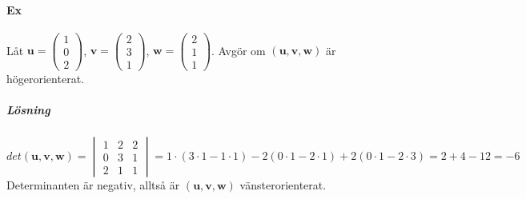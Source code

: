 \paragraph{Ex} Låt $\bm{u}=\begin{pmatrix}1\\0\\2\end{pmatrix}$, $\bm{v}=\begin{pmatrix}2\\3\\1\end{pmatrix}$, $\bm{w}=\begin{pmatrix}2\\1\\1\end{pmatrix}$.
Avgör om $(\bm{u},\bm{v},\bm{w})$ är högerorienterat.
\subparagraph{Lösning} 
\begin{equation*}
    det(\bm{u},\bm{v},\bm{w})=
    \begin{vmatrix}1&2&2\\0&3&1\\2&1&1\end{vmatrix}
    =1\cdot (3\cdot 1- 1\cdot 1)-2(0\cdot 1-2\cdot 1)+2(0\cdot 1-2\cdot 3)
    =2+4-12=-6
\end{equation*}
Determinanten är negativ, alltså är $(\bm{u},\bm{v},\bm{w})$ vänsterorienterat.

